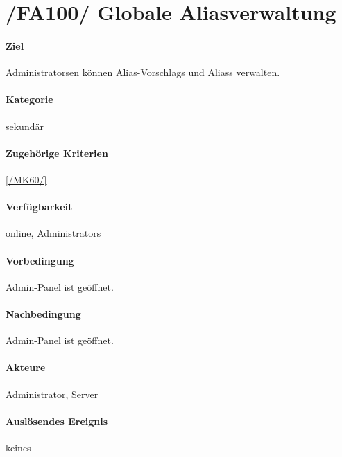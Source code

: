 \section[Globale Aliasverwaltung]{/FA100/ Globale Aliasverwaltung}
\label{/FA100/}
\paragraph{Ziel}
\Glspl{Administrator}en können \Glspl{Alias-Vorschlag} und  \Glspl{Alias} verwalten.
\paragraph{Kategorie}
sekundär
\paragraph{Zugehörige Kriterien}
\ref{/MK60/}
\paragraph{Verfügbarkeit}
online, \Glspl{Administrator}
\paragraph{Vorbedingung}
\Gls{Admin-Panel} ist geöffnet.
\paragraph{Nachbedingung}
\Gls{Admin-Panel} ist geöffnet.
\paragraph{Akteure}
\Gls{Administrator}, \Gls{Server}
\paragraph{Auslösendes Ereignis}
keines
